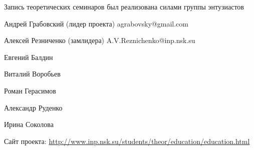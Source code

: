 \documentclass[12pt,pagesize,paper=192mm:108mm]{scrbook}
\begin{document}
\vspace*{0em}
%

  \begin{center}    
  \vfill

    \begin{minipage}{0.8\linewidth}
      Запись теоретических семинаров был реализована силами группы
      энтузиастов \bigskip

Андрей Грабовский (лидер проекта) agrabovsky@gmail.com

Алексей Резниченко (замлидера) A.V.Reznichenko@inp.nsk.su

Евгений Балдин 

Виталий Воробьев 

Роман Герасимов

Александр Руденко

Ирина Соколова
\bigskip

\begin{flushleft}
  Сайт проекта:
  \url{http://www.inp.nsk.su/students/theor/education/education.html}
\end{flushleft}
    \end{minipage}
    \vfill

  \end{center}
\end{document}
